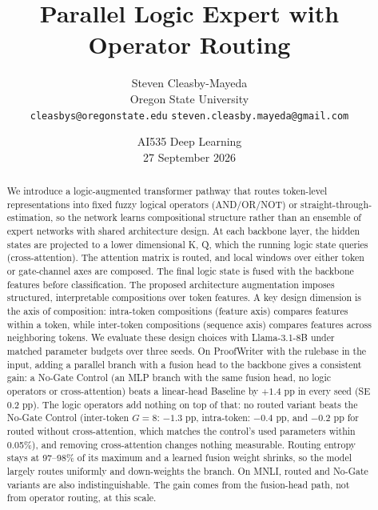 \documentclass[10pt,twocolumn,letterpaper]{article}
\begin{document}
\title{Parallel Logic Expert with Operator Routing}

\author{
Steven Cleasby-Mayeda\\
Oregon State University\\
{\tt\small cleasbys@oregonstate.edu}
{\tt\small steven.cleasby.mayeda@gmail.com}
}
\date{AI535 Deep Learning \\ 27 September 2026}

\maketitle
\begin{abstract}
We introduce a logic-augmented transformer pathway that routes token-level
representations into fixed fuzzy logical operators (AND/OR/NOT) or straight-through-estimation,
so the network learns compositional structure rather than an ensemble of expert networks
with shared architecture design. At each backbone layer, the hidden states are
projected to a lower dimensional K, Q, which the running logic state queries
(cross-attention). The attention matrix is routed, and local
windows over either token or gate-channel axes are composed.
The final logic state is fused with the backbone features before classification.
The proposed architecture augmentation imposes structured, interpretable compositions over
token features. A key design dimension is the axis of composition:
intra-token compositions (feature axis) compares features within a token, while
inter-token compositions (sequence axis) compares features across neighboring
tokens. We evaluate these design choices with Llama-3.1-8B under matched
parameter budgets over three seeds. On ProofWriter with the rulebase in the
input, adding a parallel branch with a fusion head to the backbone gives a
consistent gain: a No-Gate Control (an MLP branch with the same fusion head, no
logic operators or cross-attention) beats a linear-head Baseline by
$+1.4$ pp in every seed (SE 0.2 pp). The logic operators add nothing on top of
that: no routed variant beats the No-Gate Control (inter-token $G=8$:
$-1.3$ pp, intra-token: $-0.4$ pp, and $-0.2$ pp for routed without cross-attention, which
matches the control's used parameters within 0.05\%), and removing
cross-attention changes nothing measurable. Routing entropy stays at 97--98\% of its maximum and a
learned fusion weight shrinks, so the model largely routes uniformly and
down-weights the branch. On MNLI, routed and No-Gate variants are also
indistinguishable. The gain comes from the fusion-head path, not from operator
routing, at this scale.
\end{abstract}
\end{document}
